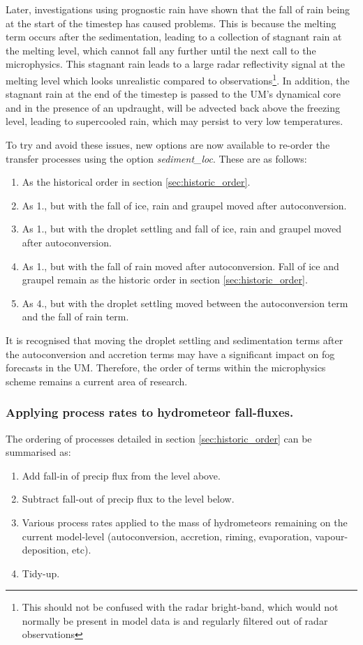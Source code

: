 \documentclass{UMDP_article}
\begin{document}
Later, investigations using prognostic rain have shown that the fall of rain being at
the start of the timestep has caused problems. This is because the melting term occurs
after the sedimentation, leading to a collection of stagnant rain at the melting level,
which cannot fall any further until the next call to the microphysics. This stagnant rain
leads to a large radar reflectivity signal at the melting level which looks unrealistic
compared to observations\footnote{This should not be confused with the radar bright-band,
which would not normally be present in model data is and regularly filtered out of radar
observations}. In addition, the stagnant rain at the end of the timestep is passed to
the UM's dynamical core and in the presence of an updraught, will be advected back
above the freezing level, leading to supercooled rain, which may persist to very low
temperatures.

To try and avoid these issues, new options are now available to re-order the transfer
processes using the option \textit{sediment\_loc}. These are as follows:
\begin{enumerate}
\item As the historical order in section \ref{sec:historic_order}.
\item As 1., but with the fall of ice, rain and graupel moved after autoconversion.
\item As 1., but with the droplet settling and fall of ice, rain and graupel
moved after autoconversion.
\item As 1., but with the fall of rain moved after autoconversion.
Fall of ice and graupel remain as the historic order in section \ref{sec:historic_order}.
\item As 4., but with the droplet settling moved between the autoconversion term and the
fall of rain term.
\end{enumerate}


It is recognised that moving the droplet settling and sedimentation terms after the
autoconversion and accretion terms may have a significant impact on fog forecasts
in the UM. Therefore, the order of terms within the microphysics scheme remains a
current area of research.

\subsubsection{Applying process rates to hydrometeor fall-fluxes.}
\label{sec:proc_fluxes}

The ordering of processes detailed in section \ref{sec:historic_order} can
be summarised as:
\begin{enumerate}
\item Add fall-in of precip flux from the level above.
\item Subtract fall-out of precip flux to the level below.
\item Various process rates applied to the mass of hydrometeors remaining
on the current model-level
(autoconversion, accretion, riming, evaporation, vapour-deposition, etc).
\item Tidy-up.
\end{enumerate}
\end{document}
